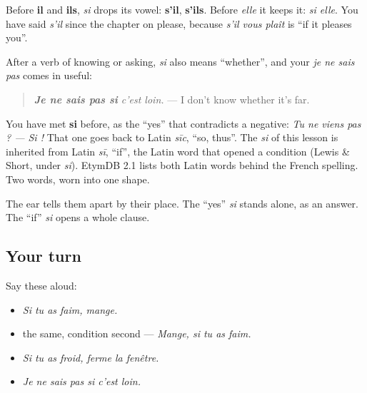 \begin{grammarlens}[title={Grammar Lens: s'il, and si for \textquotedblleft{}whether\textquotedblright{}}]
Before \textbf{il} and \textbf{ils}, \emph{si} drops its vowel: \textbf{s'il}, \textbf{s'ils}. Before \emph{elle} it keeps it: \emph{si elle}. You have said \emph{s'il} since the chapter on please, because \emph{s'il vous plaît} is \textquotedblleft{}if it pleases you\textquotedblright{}.

After a verb of knowing or asking, \emph{si} also means \textquotedblleft{}whether\textquotedblright{}, and your \emph{je ne sais pas} comes in useful:

\begin{quote}
\emph{\textbf{Je ne sais pas si} c'est loin.} — I don't know whether it's far.
\end{quote}
\end{grammarlens}

\begin{cousinweb}
You have met \textbf{si} before, as the \textquotedblleft{}yes\textquotedblright{} that contradicts a negative: \emph{Tu ne viens pas ? — Si !} That one goes back to Latin \emph{sīc}, \textquotedblleft{}so, thus\textquotedblright{}. The \emph{si} of this lesson is inherited from Latin \emph{sī}, \textquotedblleft{}if\textquotedblright{}, the Latin word that opened a condition (Lewis \& Short, under \emph{si}). EtymDB 2.1 lists both Latin words behind the French spelling. Two words, worn into one shape.

The ear tells them apart by their place. The \textquotedblleft{}yes\textquotedblright{} \emph{si} stands alone, as an answer. The \textquotedblleft{}if\textquotedblright{} \emph{si} opens a whole clause.
\end{cousinweb}

\subsection*{Your turn}
Say these aloud:

\begin{itemize}
\raggedright
  \item \emph{Si tu as faim, mange.}
  \item the same, condition second — \emph{Mange, si tu as faim.}
  \item \emph{Si tu as froid, ferme la fenêtre.}
  \item \emph{Je ne sais pas si c'est loin.}
\end{itemize}

